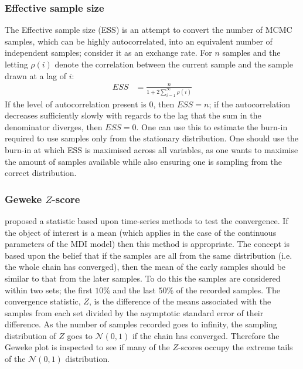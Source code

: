 \documentclass[12pt]{article} %
\begin{document}
	\subsubsection{Effective sample size} \label{sec:additional_theory:sub_sec:convergence:sub_sub_sec:ess}
	The Effective sample size (ESS) \citep{ripley2009stochastic} is an attempt to convert the number of MCMC samples, which can be highly autocorrelated, into an equivalent number of independent samples; consider it as an exchange rate. For $n$ samples and the letting $\rho(i)$ denote the correlation between the current sample and the sample drawn at a lag of $i$:
	\begin{align} \label{eqn:effective_smaple_size}
	ESS &= \frac{n}{1 + 2 \sum_{i=1}^\infty \rho(i)}
	\end{align}
	If the level of autocorrelation present is 0, then $ESS=n$;  if the autocorrelation decreases sufficiently slowly with regards to the lag that the sum in the denominator diverges, then $ESS=0$. One can use this to estimate the burn-in required to use samples only from the stationary distribution. One should use the burn-in at which ESS is maximised across all variables, as one wants to maximise the amount of samples available  while also ensuring one is sampling from the correct distribution.
		
	\subsubsection{Geweke $Z$-score} \label{sec:additional_theory:sub_sec:convergence:sub_sub_sec:geweke}
	\citet{GewekeEvaluatingAccuracySamplingBased} proposed a statistic based upon time-series methods to test the convergence. If the object of interest is a mean (which applies in the case of the continuous parameters of the MDI model) then this method is appropriate. The concept is based upon the belief that if the samples are all from the same distribution (i.e. the whole chain has converged), then the mean of the early samples should be similar to that from the later samples. To do this the samples are considered within two sets; the first $10\%$ and the last $50\%$ of the recorded samples.  The convergence statistic, $Z$, is the difference of the means associated with the samples from each set divided by the asymptotic standard error of their difference. As the number of samples recorded goes to infinity, the sampling distribution of $Z$ goes to $\mathcal{N}(0,1)$ if the chain has converged. Therefore the Geweke plot is inspected to see if many of the $Z$-scores occupy the extreme tails of the $\mathcal{N}(0,1)$ distribution.
	
\end{document}

